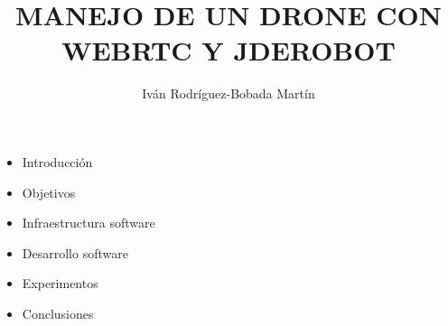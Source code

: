 \documentclass[notes,slidesec,a4]{seminar}
\title{MANEJO DE UN DRONE CON
 WEBRTC Y JDEROBOT}
\author{Iván Rodríguez-Bobada Martín}
\begin{document}
\maketitle


\begin{hslide}
\begin{itemize}
\item Introducción 
\item Objetivos
\item Infraestructura software
\item Desarrollo software
\item Experimentos
\item Conclusiones
\end{itemize}
\end{hslide}


\end{document}
